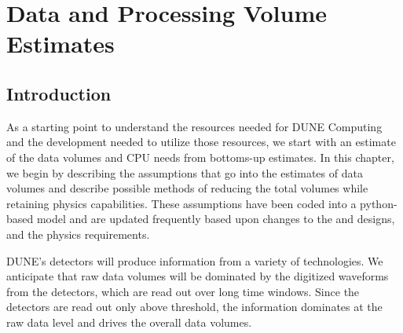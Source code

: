 \documentclass[../main-v1.tex]{subfiles}
\begin{document}
\chapter{Data and Processing Volume Estimates }

\label{ch:est}
 


\section{Introduction }%
As a starting point to understand the resources needed for DUNE Computing and the development needed to utilize those resources, we start with an estimate of the data volumes and CPU needs from bottoms-up estimates. 
In this chapter, we begin by describing the assumptions that go into the estimates of data volumes and describe possible methods of reducing the total volumes while retaining physics capabilities. 
These assumptions have been coded into a python-based model and are updated frequently based upon changes to the  and  designs, and the physics requirements.



DUNE's detectors will produce information from a variety of technologies.  We anticipate that raw data volumes will be dominated by the digitized waveforms from the  detectors, which are read out over long time windows. Since the  detectors are read out only above threshold, the  information dominates at the raw data level and drives the overall data volumes.%
\end{document}
